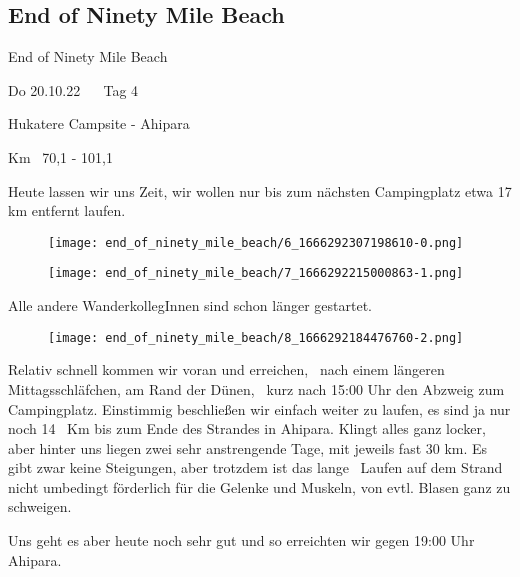 \subsection{End of Ninety Mile Beach}

End of Ninety Mile Beach


    Do 20.10.22    Tag 4
   


    Hukatere Campsite - Ahipara
   


   Km  70,1 - 101,1
  


  Heute lassen wir uns Zeit, wir wollen nur bis zum nächsten Campingplatz etwa 17 km entfernt laufen.
 


\begin{figure}[H]
	\centering
	\texttt{[image: end\_of\_ninety\_mile\_beach/6\_1666292307198610-0.png]}
	\caption{}
	\label{fig:6_1666292307198610-0}
\end{figure}

\begin{figure}[H]
	\centering
	\texttt{[image: end\_of\_ninety\_mile\_beach/7\_1666292215000863-1.png]}
	\caption{}
	\label{fig:7_1666292215000863-1}
\end{figure}

  Alle andere WanderkollegInnen sind schon länger gestartet.
 


\begin{figure}[H]
	\centering
	\texttt{[image: end\_of\_ninety\_mile\_beach/8\_1666292184476760-2.png]}
	\caption{}
	\label{fig:8_1666292184476760-2}
\end{figure}

  Relativ schnell kommen wir voran und erreichen,  nach einem längeren Mittagsschläfchen, am Rand der Dünen,  kurz nach 15:00 Uhr den Abzweig zum Campingplatz. Einstimmig beschließen wir einfach weiter zu laufen, es sind ja nur noch 14  Km bis zum Ende des Strandes in Ahipara. Klingt alles ganz locker, aber hinter uns liegen zwei sehr anstrengende Tage, mit jeweils fast 30 km. Es gibt zwar keine Steigungen, aber trotzdem ist das lange  Laufen auf dem Strand nicht umbedingt förderlich für die Gelenke und Muskeln, von evtl. Blasen ganz zu schweigen.
 


  Uns geht es aber heute noch sehr gut und so erreichten wir gegen 19:00 Uhr Ahipara.
 


